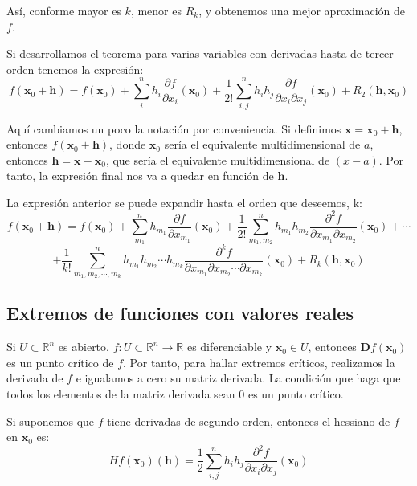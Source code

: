 \documentclass[a4paper]{article}
\begin{document}
Así, conforme mayor es $k$, menor es $R_k$, y obtenemos una mejor aproximación de $f$.

Si desarrollamos el teorema para varias variables con derivadas hasta de tercer orden tenemos la expresión:
\[ f(\textbf{x}_0+\textbf{h}) = f(\textbf{x}_0) + \sum^n_i{h_i\frac{\partial f}{\partial x_i}(\textbf{x}_0)} + \frac{1}{2!} \sum^n_{i,j}{h_ih_j\frac{\partial f}{\partial x_i \partial x_j}(\textbf{x}_0)} + R_2(\textbf{h}, \textbf{x}_0) \]

Aquí cambiamos un poco la notación por conveniencia. Si definimos $\textbf{x} = \textbf{x}_0 + \textbf{h}$, entonces  $f(\textbf{x}_0+\textbf{h})$, donde $\textbf{x}_0$ sería el equivalente multidimensional de $a$, entonces $\textbf{h} = \textbf{x} - \textbf{x}_0$, que sería el equivalente multidimensional de $(x-a)$. Por tanto, la expresión final nos va a quedar en función de $\textbf{h}$.

La expresión anterior se puede expandir hasta el orden que deseemos, k:
\[ f(\textbf{x}_0+\textbf{h}) = f(\textbf{x}_0) + \sum^n_{m_1}{h_{m_1}\frac{\partial f}{\partial x_{m_1}}(\textbf{x}_0)} + \frac{1}{2!} \sum^n_{{m_1},{m_2}}{h_{m_1}h_{m_2}\frac{\partial^2 f}{\partial x_{m_1} \partial x_{m_2}}(\textbf{x}_0)} + \cdots \]\[+
 \frac{1}{k!} \sum^n_{{m_1},{m_2},\cdots,{m_k}}{h_{m_1}h_{m_2}\cdots h_{m_k}\frac{\partial^k f}{\partial x_{m_1} \partial x_{m_2} \cdots\partial x_{m_k}}(\textbf{x}_0)}
  + R_k(\textbf{h}, \textbf{x}_0) \]

\subsection{Extremos de funciones con valores reales}
Si $U \subset \mathbb{R}^n$ es abierto, $f: U \subset \mathbb{R}^n \rightarrow \mathbb{R}$ es diferenciable y $\textbf{x}_0 \in U$, entonces $\textbf{D}f(\textbf{x}_0)$ es un punto crítico de $f$. Por tanto, para hallar extremos críticos, realizamos la derivada de $f$ e igualamos a cero su matriz derivada. La condición que haga que todos los elementos de la matriz derivada sean 0 es un punto crítico.

Si suponemos que $f$ tiene derivadas de segundo orden, entonces el hessiano de $f$ en $\textbf{x}_0$ es:
\[ Hf(\textbf{x}_0)(\textbf{h}) = \frac{1}{2} \sum^n_{i,j}{h_ih_j\frac{\partial^2 f}{\partial x_i \partial x_j}(\textbf{x}_0)}\]
\end{document}
